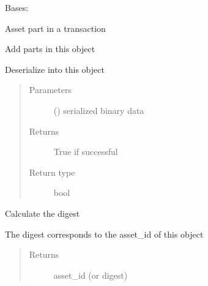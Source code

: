 \documentclass[letterpaper,10pt,english]{sphinxmanual}
\begin{document}
\begin{fulllineitems}
\label{\detokenize{bbc1.core.bbclib:bbc1.core.bbclib.BBcAsset}}
Bases: 

Asset part in a transaction

\begin{fulllineitems}
\label{\detokenize{bbc1.core.bbclib:bbc1.core.bbclib.BBcAsset.add}}
Add parts in this object

\end{fulllineitems}


\begin{fulllineitems}
\label{\detokenize{bbc1.core.bbclib:bbc1.core.bbclib.BBcAsset.deserialize}}
Deserialize into this object
\begin{quote}\begin{description}
\item[{Parameters}] \leavevmode
{} () \textendash{} serialized binary data

\item[{Returns}] \leavevmode
True if successful

\item[{Return type}] \leavevmode
bool

\end{description}\end{quote}

\end{fulllineitems}


\begin{fulllineitems}
\label{\detokenize{bbc1.core.bbclib:bbc1.core.bbclib.BBcAsset.digest}}
Calculate the digest

The digest corresponds to the asset\_id of this object
\begin{quote}\begin{description}
\item[{Returns}] \leavevmode
asset\_id (or digest)


\end{description}
\end{quote}
\end{fulllineitems}
\end{fulllineitems}
\end{document}
